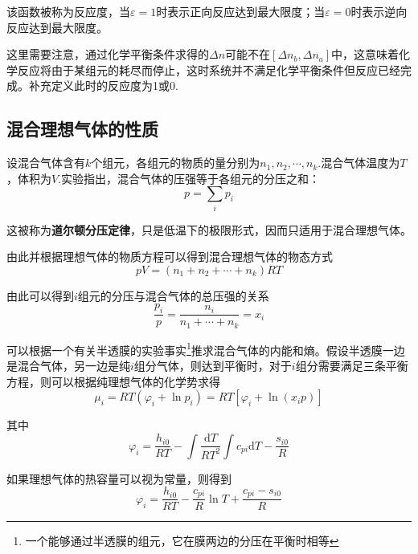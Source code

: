 \documentclass[UTF8]{ctexart}
\begin{document}
\noindent 该函数被称为反应度，当$ \varepsilon=1 $时表示正向反应达到最大限度；当$ \varepsilon=0 $时表示逆向反应达到最大限度。

	这里需要注意，通过化学平衡条件求得的$ \Delta  n $可能不在$ [\Delta n_{b}, \Delta n_{a}] $中，这意味着化学反应将由于某组元的耗尽而停止，这时系统并不满足化学平衡条件但反应已经完成。补充定义此时的反应度为1或0.
	
	\subsection{混合理想气体的性质}
	设混合气体含有$ k $个组元，各组元的物质的量分别为$ n_{1}, n_{2}, \cdots, n_{k} $.混合气体温度为$ T $，体积为$ V $.实验指出，混合气体的压强等于各组元的分压之和：
	\begin{equation}
	p=\sum_{i} p_{i}
	\end{equation}
	
\noindent 这被称为\textbf{道尔顿分压定律}，只是低温下的极限形式，因而只适用于混合理想气体。

	由此并根据理想气体的物质方程可以得到混合理想气体的物态方式
	\begin{equation}
	p V=\left(n_{1}+n_{2}+\cdots+n_{k}\right) R T
	\end{equation}
	
\noindent 由此可以得到$ i $组元的分压与混合气体的总压强的关系
\begin{equation}
\frac{p_{i}}{p}=\frac{n_{i}}{n_{1}+\cdots+n_{k}}=x_{i}
\end{equation}

	可以根据一个有关半透膜的实验事实\footnote{一个能够通过半透膜的组元，它在膜两边的分压在平衡时相等}推求混合气体的内能和熵。假设半透膜一边是混合气体，另一边是纯$ i $组分气体，则达到平衡时，对于$ i $组分需要满足三条平衡方程，则可以根据纯理想气体的化学势求得
	\begin{equation}
	\mu_{i}=R T\left(\varphi_{i}+\ln p_{i}\right)=R T\left[\varphi_{i}+\ln \left(x_{i} p\right)\right]\label{equ_mu}
	\end{equation}
	
\noindent 其中
\begin{equation}
\varphi_{i}=\frac{h_{i 0}}{R T}-\int \frac{\mathrm{d} T}{R T^{2}} \int c_{p i} \mathrm{d} T-\frac{s_{i 0}}{R}
\end{equation}

\noindent 如果理想气体的热容量可以视为常量，则得到
\begin{equation}
\varphi_{i}=\frac{h_{i 0}}{R T}-\frac{c_{p i}}{R} \ln T+\frac{c_{p i}-s_{i 0}}{R}
\end{equation}
\end{document}
